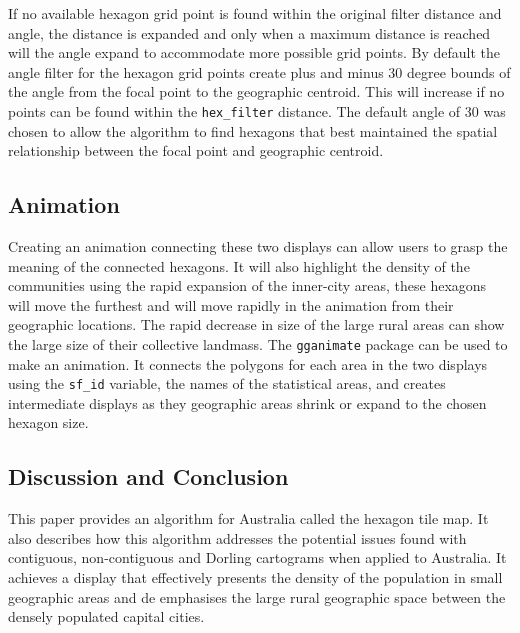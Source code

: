 If no available hexagon grid point is found within the original filter
distance and angle, the distance is expanded and only when a maximum
distance is reached will the angle expand to accommodate more possible
grid points. By default the angle filter for the hexagon grid points
create plus and minus 30 degree bounds of the angle from the focal point
to the geographic centroid. This will increase if no points can be found
within the \texttt{hex\_filter} distance. The default angle of 30 was
chosen to allow the algorithm to find hexagons that best maintained the
spatial relationship between the focal point and geographic centroid.

\hypertarget{animation}{%
\subsection{Animation}\label{animation}}

Creating an animation connecting these two displays can allow users to
grasp the meaning of the connected hexagons. It will also highlight the
density of the communities using the rapid expansion of the inner-city
areas, these hexagons will move the furthest and will move rapidly in
the animation from their geographic locations. The rapid decrease in
size of the large rural areas can show the large size of their
collective landmass. The \texttt{gganimate} \citep{gganimate} package
can be used to make an animation. It connects the polygons for each area
in the two displays using the \texttt{sf\_id} variable, the names of the
statistical areas, and creates intermediate displays as they geographic
areas shrink or expand to the chosen hexagon size.

\hypertarget{conclusion-03}{%
\subsection{Discussion and Conclusion}\label{conclusion-03}}

This paper provides an algorithm for Australia called the hexagon tile
map. It also describes how this algorithm addresses the potential issues
found with contiguous, non-contiguous and Dorling cartograms when
applied to Australia. It achieves a display that effectively presents
the density of the population in small geographic areas and de
emphasises the large rural geographic space between the densely
populated capital cities.

